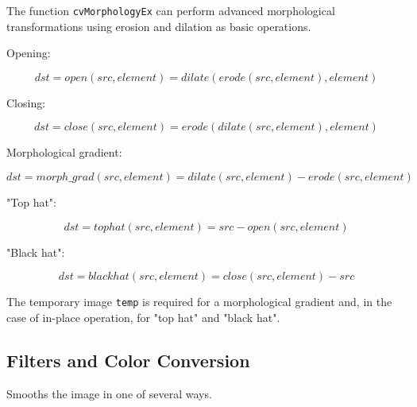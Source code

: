 \begin{description}
\begin{description}
\end{description}
\end{description}

The function \texttt{cvMorphologyEx} can perform advanced morphological transformations using erosion and dilation as basic operations.

Opening:

\[
dst=open(src,element)=dilate(erode(src,element),element)
\]

Closing:

\[
dst=close(src,element)=erode(dilate(src,element),element)
\]

Morphological gradient:

\[
dst=morph\_grad(src,element)=dilate(src,element)-erode(src,element)
\]

"Top hat":

\[
dst=tophat(src,element)=src-open(src,element)
\]

"Black hat":

\[
dst=blackhat(src,element)=close(src,element)-src
\]

The temporary image \texttt{temp} is required for a morphological gradient and, in the case of in-place operation, for "top hat" and "black hat".

\subsection{Filters and Color Conversion}

\label{Smooth}

Smooths the image in one of several ways.


